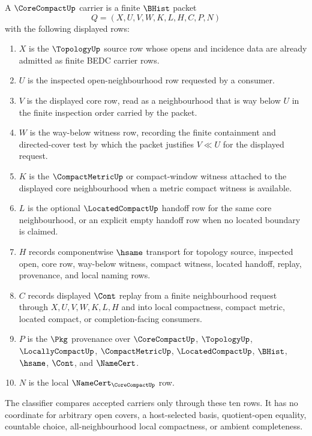 \begin{definition}
\label{def:core-compact-carrier}
A $\CoreCompactUp$ carrier is a finite $\BHist$ packet
$$
Q=(X,U,V,W,K,L,H,C,P,N)
$$
with the following displayed rows:
\begin{enumerate}
\item $X$ is the $\TopologyUp$ source row whose opens and incidence data are already admitted as finite BEDC carrier rows.
\item $U$ is the inspected open-neighbourhood row requested by a consumer.
\item $V$ is the displayed core row, read as a neighbourhood that is way below $U$ in the finite inspection order carried by the packet.
\item $W$ is the way-below witness row, recording the finite containment and directed-cover test by which the packet justifies $V \ll U$ for the displayed request.
\item $K$ is the $\CompactMetricUp$ or compact-window witness attached to the displayed core neighbourhood when a metric compact witness is available.
\item $L$ is the optional $\LocatedCompactUp$ handoff row for the same core neighbourhood, or an explicit empty handoff row when no located boundary is claimed.
\item $H$ records componentwise $\hsame$ transport for topology source, inspected open, core row, way-below witness, compact witness, located handoff, replay, provenance, and local naming rows.
\item $C$ records displayed $\Cont$ replay from a finite neighbourhood request through $X,U,V,W,K,L,H$ and into local compactness, compact metric, located compact, or completion-facing consumers.
\item $P$ is the $\Pkg$ provenance over $\CoreCompactUp$, $\TopologyUp$, $\LocallyCompactUp$, $\CompactMetricUp$, $\LocatedCompactUp$, $\BHist$, $\hsame$, $\Cont$, and $\NameCert$.
\item $N$ is the local $\NameCert_{\CoreCompactUp}$ row.
\end{enumerate}
The classifier compares accepted carriers only through these ten rows. It has no coordinate for arbitrary open covers, a host-selected basis, quotient-open equality, countable choice, all-neighbourhood local compactness, or ambient completeness.
\end{definition}

